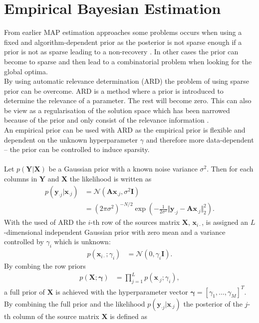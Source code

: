 \section{Empirical Bayesian Estimation}
From earlier MAP estimation approaches some problems occurs when using a fixed and algorithm-dependent prior as the posterior is not sparse enough if a prior is not as sparse leading to a non-recovery . In other cases the prior can become to sparse and then lead to a combinatorial problem when looking for the global optima.
\\
By using automatic relevance determination (ARD) the problem of using sparse prior can be overcome. ARD is a method where a prior is introduced to determine the relevance of a parameter. The rest will become zero. This can also be view as a regularisation of the solution space which has been narrowed because of the prior and only consist of the relevance information \cite{ARD}.
\\
An empirical prior can be used with ARD as the empirical prior is flexible and dependent on the unknown hyperparameter $\gamma$ and therefore more data-dependent -- the prior can be controlled to induce sparsity.
\\ \\
Let $p(\mathbf{Y} \vert \mathbf{X})$ be a Gaussian prior with a known noise variance $\sigma^2$. Then for each columns in $\mathbf{Y}$ and $\mathbf{X}$ the likelihood is written as
\begin{align*}
p(\mathbf{y}_{\cdot j} \vert \mathbf{x}_{\cdot j}) &= \mathcal{N}(\mathbf{Ax}_{.j}, \sigma^2 \mathbf{I}) \\
&= (2 \pi \sigma^2)^{-N/2} \exp \left( - \frac{1}{2 \sigma^2} \Vert \mathbf{y}_{\cdot j} - \mathbf{A} \mathbf{x}_{\cdot j} \Vert_2^2 \right).
\end{align*}
With the used of ARD the $i$-th row of the sources matrix $\mathbf{X}$, $\mathbf{x}_{i \cdot}$, is assigned an $L$-dimensional independent Gaussian prior with zero mean and a variance controlled by $\gamma_i$ which is unknown:
\begin{align*}
p (\mathbf{x}_{i \cdot} ; \gamma_i) &= \mathcal{N}(0, \gamma_i \mathbf{I}).
\end{align*}
By combing the row priors 
\begin{align*}
p (\mathbf{X} ; \boldsymbol{\gamma}) &= \prod_{j=1}^L p (\mathbf{x}_{ \cdot j} ; \gamma_i),
\end{align*}
a full prior of $\mathbf{X}$ is achieved with the hyperparameter vector $\boldsymbol{\gamma} = [\gamma_1, \dots, \gamma_M]^T$. By combining the full prior and the likelihood $p(\mathbf{y}_{\cdot j} \vert \mathbf{x}_{\cdot j})$ the posterior of the $j$-th column of the source matrix $\mathbf{X}$ is defined as

